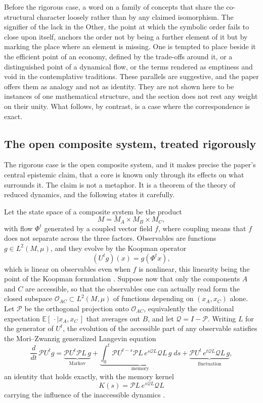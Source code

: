 Before the rigorous case, a word on a family of concepts that share the co-structural character loosely rather than by any claimed isomorphism. The signifier of the lack in the Other, the point at which the symbolic order fails to close upon itself, anchors the order not by being a further element of it but by marking the place where an element is missing. One is tempted to place beside it the efficient point of an economy, defined by the trade-offs around it, or a distinguished point of a dynamical flow, or the terms rendered as emptiness and void in the contemplative traditions. These parallels are suggestive, and the paper offers them as analogy and not as identity. They are not shown here to be instances of one mathematical structure, and the section does not rest any weight on their unity. What follows, by contrast, is a case where the correspondence is exact.

\subsection*{The open composite system, treated rigorously}

The rigorous case is the open composite system, and it makes precise the paper's central epistemic claim, that a core is known only through its effects on what surrounds it. The claim is not a metaphor. It is a theorem of the theory of reduced dynamics, and the following states it carefully.

Let the state space of a composite system be the product
\[
M = M_A \times M_B \times M_C ,
\]
with flow $\Phi^t$ generated by a coupled vector field $f$, where coupling means that $f$ does not separate across the three factors. Observables are functions $g \in L^2(M,\mu)$, and they evolve by the Koopman operator
\[
(U^t g)(x) = g(\Phi^t x),
\]
which is linear on observables even when $f$ is nonlinear, this linearity being the point of the Koopman formulation \parencite{koopman1931hamiltonian}. Suppose now that only the components $A$ and $C$ are accessible, so that the observables one can actually read form the closed subspace $\mathcal{O}_{AC} \subset L^2(M,\mu)$ of functions depending on $(x_A, x_C)$ alone. Let $\mathcal{P}$ be the orthogonal projection onto $\mathcal{O}_{AC}$, equivalently the conditional expectation $\mathbb{E}[\,\cdot \mid x_A, x_C\,]$ that averages out $B$, and let $\mathcal{Q} = I - \mathcal{P}$. Writing $L$ for the generator of $U^t$, the evolution of the accessible part of any observable satisfies the Mori--Zwanzig generalized Langevin equation
\[
\frac{d}{dt}\, \mathcal{P} U^t g
= \underbrace{\mathcal{P} U^t \mathcal{P} L\, g}_{\text{Markov}}
+ \underbrace{\int_0^t \mathcal{P} U^{t-s} \mathcal{P} L\, e^{s \mathcal{Q} L} \mathcal{Q} L\, g \; ds}_{\text{memory}}
+ \underbrace{\mathcal{P} U^t\, e^{t \mathcal{Q} L} \mathcal{Q} L\, g}_{\text{fluctuation}} ,
\]
an identity that holds exactly, with the memory kernel
\[
K(s) = \mathcal{P} L\, e^{s \mathcal{Q} L} \mathcal{Q} L
\]
carrying the influence of the inaccessible dynamics \parencite{zwanzig1961memory,mori1965transport,chorin2000optimal}.

